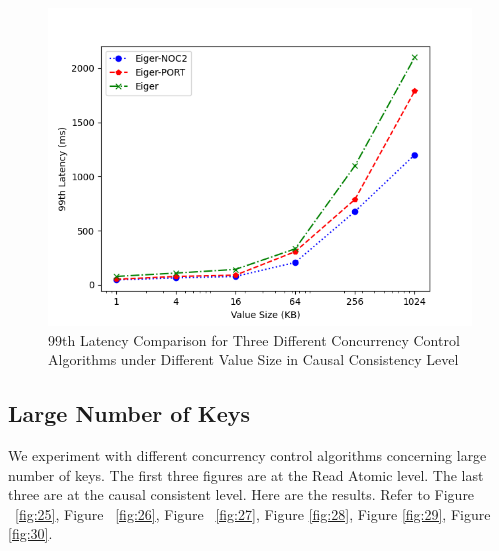 \begin{figure}[H]
    \centering
    \includegraphics[width=0.8\linewidth]{figure/5-tcc-l.png}
    \caption{99th Latency Comparison for Three Different Concurrency Control Algorithms under Different Value Size in Causal Consistency Level}
    \label{fig:24}
\end{figure}



\subsection{Large Number of Keys}

We experiment with different concurrency control algorithms concerning large number of keys. The first three figures are at the Read Atomic level. The last three are at the causal consistent level. Here are the results. Refer to Figure ~\ref{fig:25}, Figure ~\ref{fig:26}, Figure ~\ref{fig:27}, Figure \ref{fig:28}, Figure \ref{fig:29}, Figure \ref{fig:30}. 

